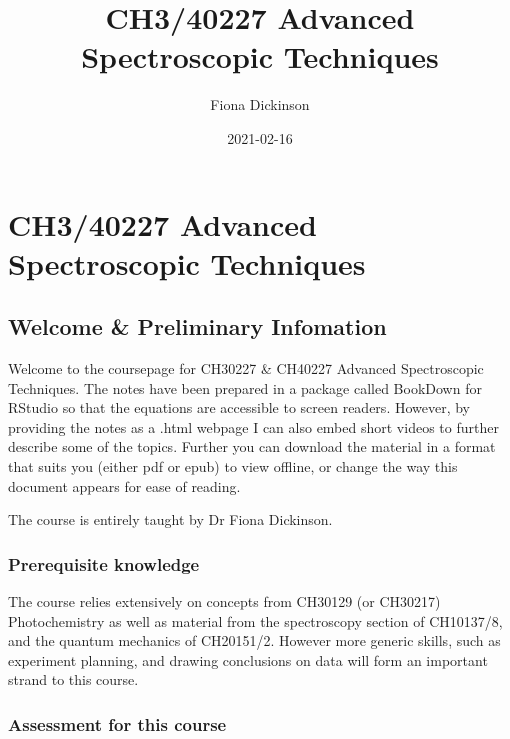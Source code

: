 \documentclass[
]{book}
\title{CH3/40227 Advanced Spectroscopic Techniques}
\author{Fiona Dickinson}
\date{2021-02-16}
\begin{document}
\maketitle

{
\setcounter{tocdepth}{1}
\tableofcontents
}
\hypertarget{ch340227-advanced-spectroscopic-techniques}{%
\chapter*{CH3/40227 Advanced Spectroscopic Techniques}\label{ch340227-advanced-spectroscopic-techniques}}

\hypertarget{welcome-preliminary-infomation}{%
\section*{Welcome \& Preliminary Infomation}\label{welcome-preliminary-infomation}}

Welcome to the coursepage for CH30227 \& CH40227 Advanced Spectroscopic Techniques. The notes have been prepared in a package called BookDown for RStudio so that the equations are accessible to screen readers. However, by providing the notes as a .html webpage I can also embed short videos to further describe some of the topics. Further you can download the material in a format that suits you (either pdf or epub) to view offline, or change the way this document appears for ease of reading.

The course is entirely taught by Dr Fiona Dickinson.

\hypertarget{prerequisite-knowledge}{%
\subsection*{Prerequisite knowledge}\label{prerequisite-knowledge}}

The course relies extensively on concepts from CH30129 (or CH30217) Photochemistry as well as material from the spectroscopy section of CH10137/8, and the quantum mechanics of CH20151/2. However more generic skills, such as experiment planning, and drawing conclusions on data will form an important strand to this course.

\hypertarget{assessment-for-this-course}{%
\subsection*{Assessment for this course}\label{assessment-for-this-course}}
\end{document}
